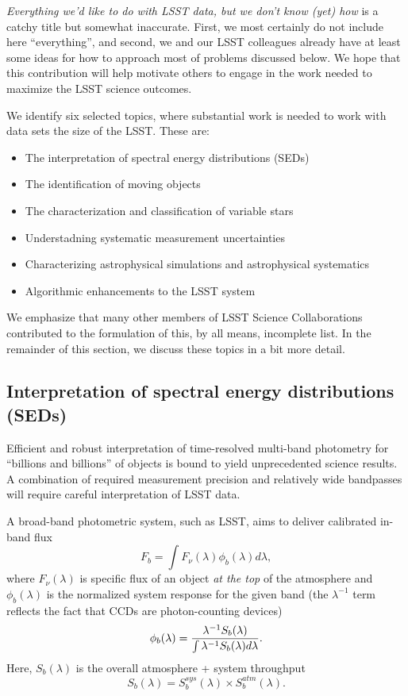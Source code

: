 \documentclass{iau}
\begin{document}
{\it Everything we’d like to do with LSST data, but we don’t know
  (yet) how} is a catchy title but somewhat inaccurate. First, we most
certainly do not include here ``everything'', and second, we and our
LSST colleagues already have at least some ideas for how to approach
most of problems discussed below.  We hope that this contribution will
help motivate others to engage in the work needed to maximize the LSST
science outcomes.

We identify six selected topics, where substantial work is needed to
work with data sets the size of the LSST. These are:
\begin{itemize}
\item The interpretation of spectral energy distributions (SEDs)
\item The identification of moving objects
\item The characterization and classification of variable stars 
\item Understadning systematic measurement uncertainties
\item Characterizing astrophysical simulations and astrophysical
  systematics
\item Algorithmic enhancements to the LSST system 
\end{itemize}

We emphasize that many other members of LSST Science Collaborations contributed to
the formulation of this, by all means, incomplete list. In the remainder of this section, 
we discuss these topics in a bit more detail. 


\subsection{Interpretation of spectral energy distributions (SEDs)}

Efficient and robust interpretation of time-resolved multi-band photometry for “billions and 
billions” of objects is bound to yield unprecedented science results. A combination of 
required measurement precision and relatively wide bandpasses will require careful
interpretation of LSST data. 

A broad-band photometric system, such as LSST, aims to deliver calibrated in-band flux
\begin{equation}
\label{Fb}
             F_b = \int{F_\nu(\lambda) \phi_b(\lambda) d\lambda},
\end{equation}
where $F_\nu(\lambda)$ is specific flux of an object {\it at the top} of 
the atmosphere and $\phi_b(\lambda)$ is the normalized system response 
for the given band (the $\lambda^{-1}$  term reflects the fact that CCDs 
are photon-counting devices)
\begin{equation}
\label{PhiDef}
\phi_b(\lambda) = {\lambda^{-1} S_b(\lambda) \over \int{\lambda^{-1} S_b(\lambda) d\lambda}}.
\end{equation}
Here, $S_b(\lambda)$ is the overall atmosphere + system throughput
\begin{equation}
\label{SDef}
         S_b(\lambda) = S_b^{sys}(\lambda) \times S_b^{atm}(\lambda). 
\end{equation}
\end{document}
